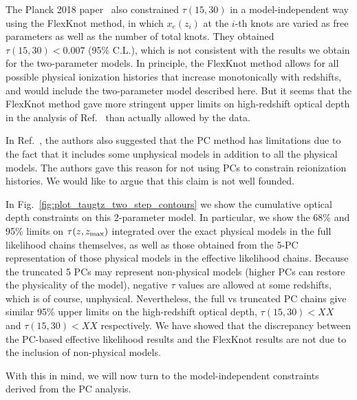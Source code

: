 \documentclass[prd,twocolumn,amsmath,amssymb,floatfix,superscriptaddress,nofootinbib]{revtex4-1}
\newcommand{\reffig}[1]{Fig.~\ref{fig:#1}}
\newcommand{\zmax}{z_{\rm max}}
\newcommand{\tauhi}{\tau_{\rm hi}}
\newcommand{\taulo}{\tau_{\rm lo}}
\newcommand{\ch}[1]{\textcolor{red}{#1}}
\begin{document}
The Planck 2018 paper~\cite{Aghanim:2018eyx} also constrained $\tau(15, 30)$ in a model-independent way using the FlexKnot method, in which $x_e(z_i)$ at the $i$-th knots are varied as free parameters as well as the number of total knots. They obtained $\tau(15, 30) < 0.007$ (95\% C.L.), which is not consistent with the results we obtain for the two-parameter models. In principle, the FlexKnot method allows for all possible physical ionization histories that increase monotonically with redshifts, and would include the two-parameter model described here. But it seems that the FlexKnot method gave more stringent upper limits on high-redshift optical depth in the analysis of Ref.~\cite{} than actually allowed by the data.

In Ref.~\cite{Aghanim:2018eyx}, the authors also suggested that the PC method has limitations due to the fact that it includes some unphysical models in addition to all the physical models. The authors gave this reason for not using PCs to constrain reionization histories. We would like to argue that this claim is not well founded. 

In Fig.~\ref{fig:plot_taugtz_two_step_contours} we show the cumulative optical depth constraints on this 2-parameter model. In particular, we show the 68\% and 95\% limits on $\tau(z, \zmax)$ integrated over the exact physical models in the full likelihood chains themselves, as well as those obtained from the 5-PC representation of those physical models in the effective likelihood chains. Because the truncated 5 PCs may represent non-physical models (higher PCs can restore the physicality of the model), negative $\tau$ values are allowed at some redshifts, which is of course, unphysical. Nevertheless, the full vs truncated PC chains give similar 95\% upper limits on the high-redshift optical depth, $\tau(15, 30) < XX$ and $\tau(15, 30) < XX$ respectively. We have showed that the discrepancy between the PC-based effective likelihood results and the FlexKnot results are not due to the inclusion of non-physical models.

With this in mind, we will now turn to the model-independent constraints derived from the PC analysis.

\end{document}

